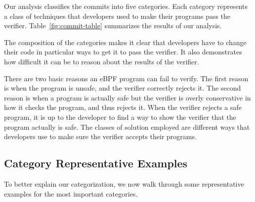 Our analysis classifies the commits into five categories.
Each category represents a class of techniques that developers used to make their programs pass the verifier.
Table~\ref{fig:commit-table} summarizes the results of our analysis.


The composition of the categories makes it clear that developers have to change their code in particular ways to get it to pass the verifier.
It also demonstrates how difficult it can be to reason about the results of the verifier.

There are two basic reasons an eBPF program can fail to verify. %
The first reason is when the program is unsafe, and the verifier correctly rejects it.
The second reason is when a program is actually safe but the verifier is overly conservative
in how it checks the program, and thus rejects it.
When the verifier rejects a safe program, it is up to the developer to find a way to show the verifier that the program actually is safe.
The classes of solution employed are different ways that developers use to make sure the verifier accepts their programs.

\subsection{Category Representative Examples}
To better explain our categorization, we now walk through some representative examples for the most important categories.

